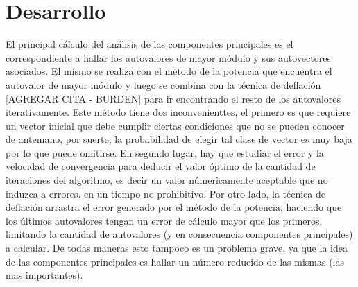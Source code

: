 \section{Desarrollo}
El principal cálculo del análisis de las componentes principales es el correspondiente a hallar los autovalores de mayor módulo y sus autovectores asociados. El mismo se realiza con el método de la potencia que encuentra el autovalor de mayor módulo y luego se combina con la técnica de deflación [AGREGAR CITA - BURDEN] para ir encontrando el resto de los autovalores iterativamente. Este método tiene dos inconvenienttes, el primero es que requiere un vector inicial que debe cumplir ciertas condiciones que no se pueden conocer de antemano, por suerte, la probabilidad de elegir tal clase de vector es muy baja por lo que puede omitirse. En segundo lugar, hay que estudiar el error y la velocidad de convergencia para deducir el valor óptimo de la cantidad de iteraciones del algoritmo, es decir un valor númericamente aceptable que no induzca a errores. en un tiempo no prohibitivo. Por otro lado, la técnica de deflación arrastra el error generado por el método de la potencia, haciendo que los últimos autovalores tengan un error de cálculo mayor  que los primeros, limitando la cantidad de autovalores (y en consecuencia componentes principales) a calcular. De todas maneras esto tampoco es un problema grave, ya que la idea de las componentes principales es hallar un número reducido de las mismas (las mas importantes).




